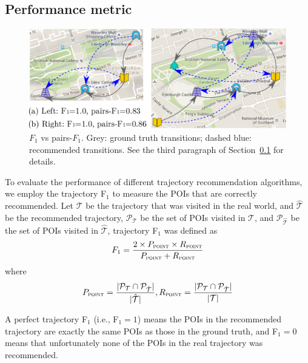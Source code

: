 \subsection{Performance metric}
\label{sec:metric}

\begin{figure}[t]
	\centering
	\includegraphics[width=\columnwidth]{fig/pairF1.pdf}
	\caption{$F_1$ vs pairs-$F_1$. Grey: ground truth transitions; dashed blue: recommended transitions. 
    See the third paragraph of Section~\ref{sec:metric} for details.}
	\label{fig:pairf1}
\end{figure}


To evaluate the performance of different trajectory recommendation algorithms,
we employ the trajectory F$_1$\cite{ijcai15} to measure the POIs that are
correctly recommended. Let $\mathcal{T}$ be the trajectory that was visited in the real world,
and $\hat{\mathcal{T}}$ be the recommended trajectory,
$\mathcal{P}_{\mathcal{T}}$ be the set of POIs visited in $\mathcal{T}$,
and $\mathcal{P}_{\hat{\mathcal{T}}}$ be the set of POIs visited in $\hat{\mathcal{T}}$,
trajectory F$_1$ was defined as
\begin{displaymath}
F_1= \frac{2 \times P_{\textsc{point}} \times R_{\textsc{point}}}
          {P_{\textsc{point}} + R_{\textsc{point}}}
\end{displaymath}
where
\begin{displaymath}
P_{\textsc{point}} = \frac{|\mathcal{P}_{\mathcal{T}} \cap \mathcal{P}_{\hat{\mathcal{T}}}|}
                          {|\hat{\mathcal{T}}|},
R_{\textsc{point}} = \frac{|\mathcal{P}_{\mathcal{T}} \cap \mathcal{P}_{\hat{\mathcal{T}}}|}
                          {|\mathcal{T}|}
\end{displaymath}

A perfect trajectory F$_1$ (i.e., F$_1 = 1$) means the POIs in
the recommended trajectory are exactly the same POIs as those in the ground truth,
and F$_1 = 0$ means that unfortunately none of the POIs in the
real trajectory was recommended.

